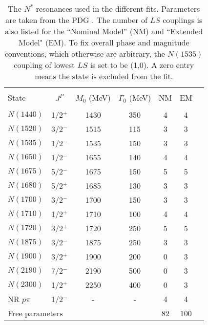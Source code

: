 \begin{table}[htb]
\centering
\caption{The $N^*$ resonances used in the different fits. 
Parameters are taken from the PDG \supercite{PDG}. 
The number of $LS$ couplings is also listed for the ``Nominal Model'' (NM) and ``Extended  Model" (EM).
To fix overall phase and magnitude conventions, 
which otherwise are arbitrary, 
the $N(1535)$ coupling of lowest $LS$ is set to be (1,0).  
A zero entry means the state is excluded from the fit. }
\label{tab:Lstar}
\vspace{0.2cm}
\begin{tabular}{lcccccc}
\hline\\[-2.5ex]
State & $J^P$ & $M_0$ (MeV) & $\Gamma_0$ (MeV)&  NM & EM   \\
\hline \\[-2.5ex]
$N(1440)$ &1/2$^+$ 	& 1430 & 350 	& 4 & 4 \\
$N(1520)$ &3/2$^-$ 	& 1515 & 115 	& 3 & 3 \\
$N(1535)$ &1/2$^-$ 	& 1535 & 150 	& 3 & 3 \\
$N(1650)$ &1/2$^-$ 	& 1655 & 140 	& 4 & 4 \\
$N(1675)$ &5/2$^-$ 	& 1675 & 150 	& 5 & 5\\
$N(1680)$ &5/2$^+$ 	& 1685 & 130 	& 3 & 3 \\
$N(1700)$ &3/2$^-$ 	& 1700& 150 	& 3 & 3 \\
$N(1710)$ &1/2$^+$ 	& 1710 & 100 	& 4 & 4 \\
$N(1720)$ &3/2$^+$ 	& 1720 & 250	& 5 & 5 \\
$N(1875)$ &3/2$^-$ 	& 1875 & 250 	& 3 & 3 \\
$N(1900)$ &3/2$^+$ 	& 1900 & 200 	& 0 & 3 \\
$N(2190)$ &7/2$^-$	& 2190& 500 	& 0 & 3 \\
$N(2300)$ &1/2$^+$ 	& 2250 & 400 	& 0 & 3\\
NR $p\pi$  &1/2$^-$ 	& - & - 		& 4 & 4 \\
\hline
\multicolumn{4}{l}{Free parameters}&  82 & 100 \\\hline
\end{tabular}
\end{table}

